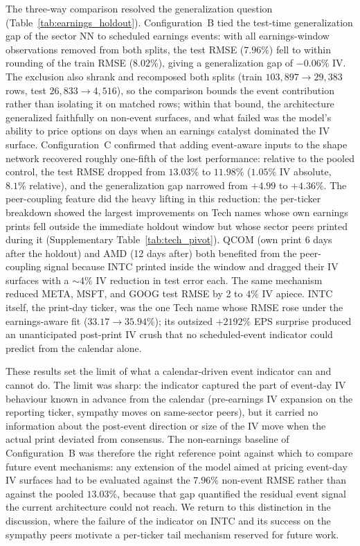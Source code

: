 The three-way comparison resolved the generalization question (Table~\ref{tab:earnings_holdout}). Configuration~B tied the test-time generalization gap of the sector NN to scheduled earnings events: with all earnings-window observations removed from both splits, the test RMSE ($7.96\%$) fell to within rounding of the train RMSE ($8.02\%$), giving a generalization gap of $-0.06\%$ IV. The exclusion also shrank and recomposed both splits (train $103{,}897 \to 29{,}383$ rows, test $26{,}833 \to 4{,}516$), so the comparison bounds the event contribution rather than isolating it on matched rows; within that bound, the architecture generalized faithfully on non-event surfaces, and what failed was the model's ability to price options on days when an earnings catalyst dominated the IV surface. Configuration~C confirmed that adding event-aware inputs to the shape network recovered roughly one-fifth of the lost performance: relative to the pooled control, the test RMSE dropped from $13.03\%$ to $11.98\%$ ($1.05\%$ IV absolute, $8.1\%$ relative), and the generalization gap narrowed from $+4.99$ to $+4.36\%$. The peer-coupling feature did the heavy lifting in this reduction: the per-ticker breakdown showed the largest improvements on Tech names whose own earnings prints fell outside the immediate holdout window but whose sector peers printed during it (Supplementary Table~\ref{tab:tech_pivot}). QCOM (own print 6 days after the holdout) and AMD (12 days after) both benefited from the peer-coupling signal because INTC printed inside the window and dragged their IV surfaces with a $\sim 4\%$ IV reduction in test error each. The same mechanism reduced META, MSFT, and GOOG test RMSE by 2 to $4\%$ IV apiece. INTC itself, the print-day ticker, was the one Tech name whose RMSE rose under the earnings-aware fit ($33.17 \to 35.94\%$); its outsized $+2192\%$ EPS surprise produced an unanticipated post-print IV crush that no scheduled-event indicator could predict from the calendar alone.

These results set the limit of what a calendar-driven event indicator can and cannot do. The limit was sharp: the indicator captured the part of event-day IV behaviour known in advance from the calendar (pre-earnings IV expansion on the reporting ticker, sympathy moves on same-sector peers), but it carried no information about the post-event direction or size of the IV move when the actual print deviated from consensus. The non-earnings baseline of Configuration~B was therefore the right reference point against which to compare future event mechanisms: any extension of the model aimed at pricing event-day IV surfaces had to be evaluated against the $7.96\%$ non-event RMSE rather than against the pooled $13.03\%$, because that gap quantified the residual event signal the current architecture could not reach. We return to this distinction in the discussion, where the failure of the indicator on INTC and its success on the sympathy peers motivate a per-ticker tail mechanism reserved for future work.
